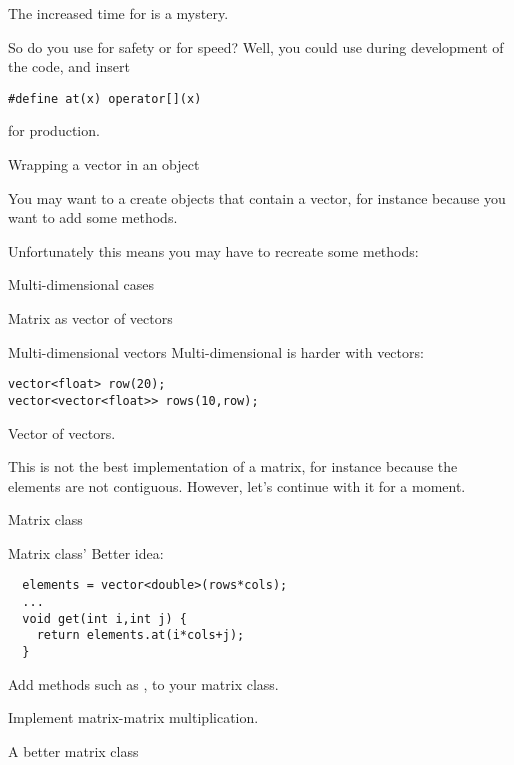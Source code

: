 The increased time for  is a mystery.

So do you use  for safety or \n{[]} for speed? Well, you could
use  during development of the code, and insert
\begin{verbatim}
#define at(x) operator[](x)
\end{verbatim}
for production.

 {Wrapping a vector in an object}

You may want to a create objects that contain a vector, for instance
because you want to add some methods.
%

Unfortunately this means you may have to recreate some methods:
%

 {Multi-dimensional cases}

 {Matrix as vector of vectors}

\begin{block}{Multi-dimensional vectors}
  \label{sl:multi-vector}
  Multi-dimensional is harder with vectors:
\begin{verbatim}
vector<float> row(20);
vector<vector<float>> rows(10,row);
\end{verbatim}
Vector of vectors.
\end{block}

This is not the best implementation of a matrix, for instance because
the elements are not contiguous. However, let's continue with it for a moment.

\begin{block}{Matrix class}
  \label{sl:matrix-class}
\end{block}

\begin{block}{Matrix class'}
  \label{sl:matrix-class-cont}
  Better idea:
\begin{verbatim}
  elements = vector<double>(rows*cols);
  ...
  void get(int i,int j) {
    return elements.at(i*cols+j);
  }
\end{verbatim}
\end{block}

\begin{exercise}
  \label{ex:matrix-methods}
  Add methods such as ,  to your matrix class.

  Implement matrix-matrix multiplication.
\end{exercise}

 {A better matrix class}

